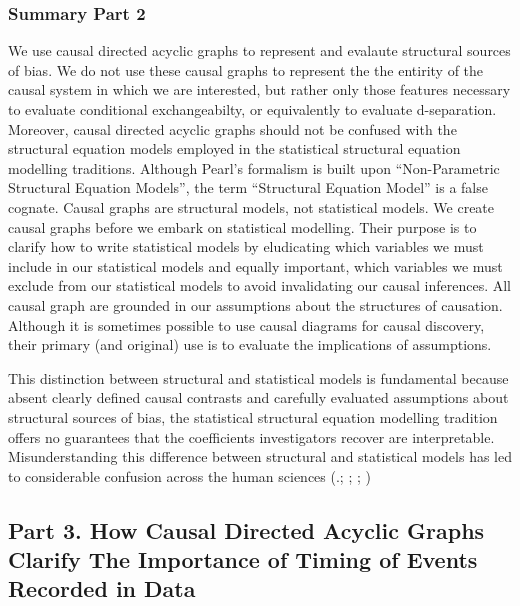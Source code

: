 \documentclass[
  single column]{article}
\begin{document}
\newpage{}

\subsubsection{Summary Part 2}\label{summary-part-2}

We use causal directed acyclic graphs to represent and evalaute
structural sources of bias. We do not use these causal graphs to
represent the the entirity of the causal system in which we are
interested, but rather only those features necessary to evaluate
conditional exchangeabilty, or equivalently to evaluate d-separation.
Moreover, causal directed acyclic graphs should not be confused with the
structural equation models employed in the statistical structural
equation modelling traditions. Although Pearl's formalism is built upon
``Non-Parametric Structural Equation Models'', the term ``Structural
Equation Model'' is a false cognate. Causal graphs are structural
models, not statistical models. We create causal graphs before we embark
on statistical modelling. Their purpose is to clarify how to write
statistical models by eludicating which variables we must include in our
statistical models and equally important, which variables we must
exclude from our statistical models to avoid invalidating our causal
inferences. All causal graph are grounded in our assumptions about the
structures of causation. Although it is sometimes possible to use causal
diagrams for causal discovery, their primary (and original) use is to
evaluate the implications of assumptions.

This distinction between structural and statistical models is
fundamental because absent clearly defined causal contrasts and
carefully evaluated assumptions about structural sources of bias, the
statistical structural equation modelling tradition offers no guarantees
that the coefficients investigators recover are interpretable.
Misunderstanding this difference between structural and statistical
models has led to considerable confusion across the human sciences
(.;
;
;
)

\subsection{Part 3. How Causal Directed Acyclic Graphs Clarify The
Importance of Timing of Events Recorded in
Data}\label{part-3.-how-causal-directed-acyclic-graphs-clarify-the-importance-of-timing-of-events-recorded-in-data}
\end{document}
